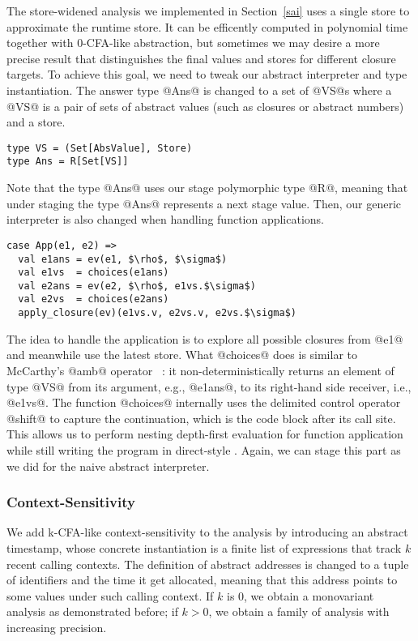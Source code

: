 The store-widened analysis we implemented in Section~\ref{sai} uses a single
store to approximate the runtime store. It can be efficently computed in
polynomial time together with 0-CFA-like abstraction, but sometimes we may
desire a more precise result that distinguishes the final values and stores for
different closure targets. To achieve this goal, we need to tweak our abstract
interpreter and type instantiation. The answer type @Ans@ is changed to a set of
@VS@s where a @VS@ is a pair of sets of abstract values (such as closures or
abstract numbers) and a store.

\begin{lstlisting}
type VS = (Set[AbsValue], Store)
type Ans = R[Set[VS]]
\end{lstlisting}

Note that the type @Ans@ uses our stage polymorphic type @R@, meaning that under
staging the type @Ans@ represents a next stage value. Then, our generic
interpreter is also changed when handling function applications.

\begin{lstlisting}
case App(e1, e2) =>
  val e1ans = ev(e1, $\rho$, $\sigma$)
  val e1vs  = choices(e1ans)
  val e2ans = ev(e2, $\rho$, e1vs.$\sigma$)
  val e2vs  = choices(e2ans)
  apply_closure(ev)(e1vs.v, e2vs.v, e2vs.$\sigma$)
\end{lstlisting}

The idea to handle the application is to explore all possible closures from @e1@
and meanwhile use the latest store. What @choices@ does is similar to McCarthy's
@amb@ operator ~\cite{MCCARTHY196333}: it non-deterministically returns an
element of type @VS@ from its argument, e.g., @e1ans@, to its right-hand side
receiver, i.e., @e1vs@. The function @choices@ internally uses the delimited
control operator @shift@ to capture the continuation, which is the code block
after its call site. This allows us to perform nesting depth-first evaluation
for function application while still writing the program in direct-style
\cite{Wei:2018:RAA:3243631.3236800}. Again, we can stage this part as we did for
the naive abstract interpreter.

\subsubsection{Context-Sensitivity}

We add k-CFA-like context-sensitivity to the analysis by introducing an abstract
timestamp, whose concrete instantiation is a finite list of expressions that
track $k$ recent calling contexts. The definition of abstract addresses is
changed to a tuple of identifiers and the time it get allocated, meaning that
this address points to some values under such calling context. If $k$ is 0, we
obtain a monovariant analysis as demonstrated before; if $k > 0$, we obtain a
family of analysis with increasing precision.

